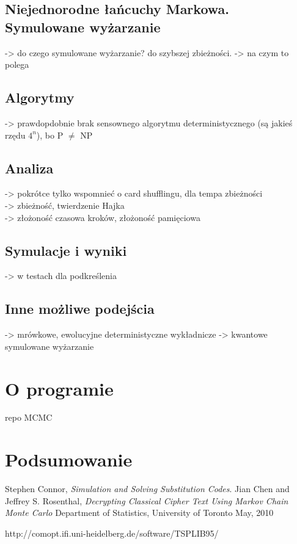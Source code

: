\documentclass[a4paper]{article}
\begin{document}
\subsection{Niejednorodne łańcuchy Markowa. Symulowane wyżarzanie}
-> do czego symulowane wyżarzanie? do szybszej zbieżności.
-> na czym to polega
\subsection{Algorytmy}
-> prawdopdobnie brak sensownego algorytmu deterministycznego (są jakieś rzędu $4^n$), bo P $\neq$ NP
\subsection{Analiza}
-> pokrótce tylko wspomnieć o card shufflingu, dla tempa zbieżności \\
-> zbieżność, twierdzenie Hajka \\
-> złożoność czasowa kroków, złożoność pamięciowa
\subsection{Symulacje i wyniki}
-> w testach dla podkreślenia
\subsection{Inne możliwe podejścia}
-> mrówkowe, ewolucyjne deterministyczne wykładnicze
-> kwantowe symulowane wyżarzanie
\section{O programie}
repo MCMC
\section{Podsumowanie}


\newpage
\begin{thebibliography}{9}

  Stephen Connor,
  \emph{Simulation and Solving Substitution Codes}.
 Jian Chen and Jeffrey S. Rosenthal,
  \emph{Decrypting Classical Cipher Text Using Markov Chain Monte Carlo}
Department of Statistics, University of Toronto
May, 2010

http://comopt.ifi.uni-heidelberg.de/software/TSPLIB95/
\end{thebibliography}
\end{document}
